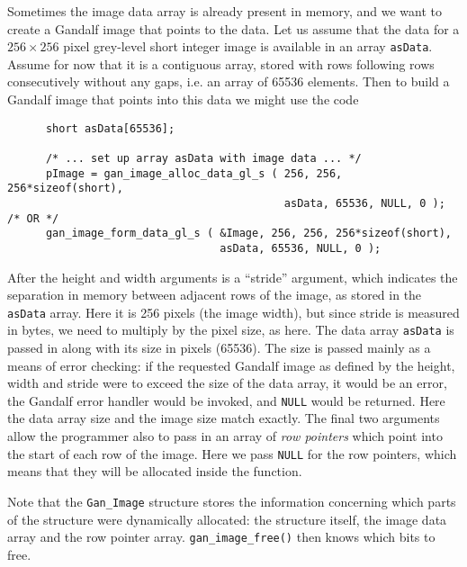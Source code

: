 Sometimes the image data array is already present in memory, and we want
to create a Gandalf image that points to the data. Let us assume that the
data for a $256\times 256$ pixel grey-level short integer image is available
in an array {\tt asData}. Assume for now that it is a contiguous array,
stored with rows following rows consecutively without any gaps, i.e. an
array of 65536 elements. Then to build a Gandalf image that points into
this data we might use the code
\begin{verbatim}
      short asData[65536];

      /* ... set up array asData with image data ... */
      pImage = gan_image_alloc_data_gl_s ( 256, 256, 256*sizeof(short),
                                           asData, 65536, NULL, 0 ); /* OR */
      gan_image_form_data_gl_s ( &Image, 256, 256, 256*sizeof(short),
                                 asData, 65536, NULL, 0 );
\end{verbatim}
After the height and width arguments is a ``stride'' argument, which indicates
the separation in memory between adjacent rows of the image, as stored in
the {\tt asData} array. Here it is 256 pixels (the image width), but since
stride is measured in bytes, we need to multiply by the pixel size, as here.
The data array {\tt asData} is passed in along with its size in pixels (65536).
The size is passed mainly as a means of error checking: if the requested
Gandalf image as defined by the height, width and stride were to exceed the
size of the data array, it would be an error, the Gandalf error handler
would be invoked, and {\tt NULL} would be returned. Here the data array size
and the image size match exactly. The final two arguments allow the programmer
also to pass in an array of {\em row pointers} which point into the start
of each row of the image. Here we pass {\tt NULL} for the row pointers, which
means that they will be allocated inside the function.

Note that the {\tt Gan\_Image} structure stores the information concerning
which parts of the structure were dynamically allocated: the structure itself,
the image data array and the row pointer array. {\tt gan\_image\_free()}
then knows which bits to free.

